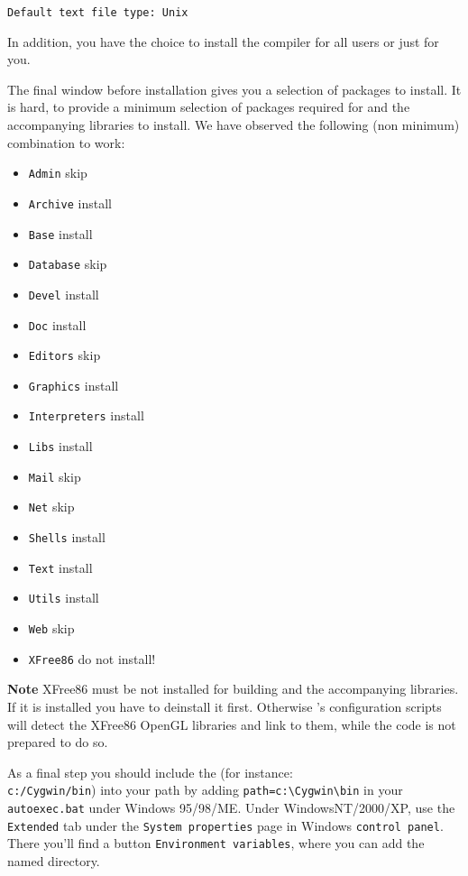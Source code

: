  \texttt{Default text file type: Unix}

\noindent
 In addition, you have the choice to install the compiler for all users or just for you.
 
  The final window before installation gives you a selection of
  packages to install. It is hard, to provide a minimum selection of
  packages required for \FlightGear{} and the accompanying libraries to
  install. We have observed the following (non minimum) combination to
  work:
  
  \begin{itemize}
  \item{\texttt{Admin}} skip
  \item{\texttt{Archive}} install
  \item{\texttt{Base}} install
  \item{\texttt{Database}} skip
  \item{\texttt{Devel}} install
  \item{\texttt{Doc}} install
  \item{\texttt{Editors}} skip
  \item{\texttt{Graphics}} install
  \item{\texttt{Interpreters}} install
  \item{\texttt{Libs}} install
  \item{\texttt{Mail}} skip
  \item{\texttt{Net}} skip
  \item{\texttt{Shells}} install
  \item{\texttt{Text}} install
  \item{\texttt{Utils}} install
  \item{\texttt{Web}} skip
  \item{\texttt{XFree86}} do not install!
  \end{itemize}

\textbf{Note} XFree86 must be not installed for building \FlightGear{} and the accompanying libraries. If it is installed you have to deinstall it first. Otherwise \FlightGear{}'s configuration scripts will detect the XFree86 OpenGL libraries and link to them, while the code is not prepared to do so.

As a final step you should include the  (for instance:\\
\texttt{c:/Cygwin/bin}) into your path by adding \verb/path=c:\Cygwin\bin/ in
your \texttt{autoexec.bat} under Windows 95/98/ME. Under
WindowsNT/2000/XP, use the \texttt{Extended} tab under the
\texttt{System properties} page in Windows \texttt{control panel}.
There you'll find a button \texttt{Environment variables}, where you
can add the named directory.

